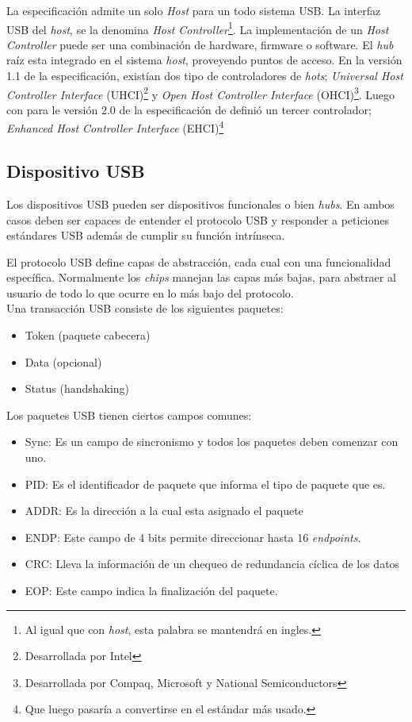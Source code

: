 La especificaci\'on admite un solo \emph{Host} para un todo sistema USB. La
interfaz USB del \emph{host}, se la denomina \emph{Host
Controller}\footnote{Al igual que con \emph{host}, esta palabra se mantendr\'a
en ingles.}. La implementaci\'on de un \emph{Host Controller} puede ser una
combinaci\'on de hardware, firmware o software. El \emph{hub} ra\'iz esta
integrado en el sistema \emph{host}, proveyendo puntos de acceso.
En la versi\'on 1.1 de la especificaci\'on, exist\'ian dos tipo de
controladores de \emph{hots}; \emph{Universal Host Controller Interface}
(UHCI)\footnote{Desarrollada por Intel} y \emph{Open Host Controller Interface}
(OHCI)\footnote{Desarrollada por Compaq, Microsoft y National Semiconductors}.
Luego con para le versi\'on 2.0 de la especificaci\'on de defini\'o un tercer
controlador; \emph{Enhanced Host Controller Interface} (EHCI)\footnote{Que
luego pasar\'ia a convertirse en el est\'andar m\'as usado.}


\subsection{Dispositivo USB}

Los dispositivos USB pueden ser dispositivos funcionales o bien \emph{hubs}.
En ambos casos deben ser capaces de entender el protocolo USB y responder a
peticiones est\'andares USB adem\'as de cumplir su funci\'on intr\'inseca. 



El protocolo USB define capas de abstracci\'on, cada cual con una funcionalidad
espec\'ifica. Normalmente los \emph{chips} manejan las capas m\'as bajas, para
abstraer al usuario de todo lo que ocurre en lo m\'as bajo del protocolo.\\

Una transacci\'on USB consiste de los siguientes paquetes:
\begin{itemize}
 \item Token (paquete cabecera)
 \item Data (opcional)
 \item Status (handshaking)
\end{itemize}

Los paquetes USB tienen ciertos campos comunes: 
\begin{itemize}
 \item Sync: Es un campo de sincronismo y todos los paquetes deben comenzar
con uno.
 \item PID: Es el identificador de paquete que informa el tipo de paquete que
es.
 \item ADDR: Es la direcci\'on a la cual esta asignado el paquete
 \item ENDP: Este campo de 4 bits permite direccionar hasta 16
\emph{endpoints}.
 \item CRC: Lleva la informaci\'on de un chequeo de redundancia c\'iclica de
los datos
 \item EOP: Este campo indica la finalizaci\'on del paquete.
\end{itemize}

